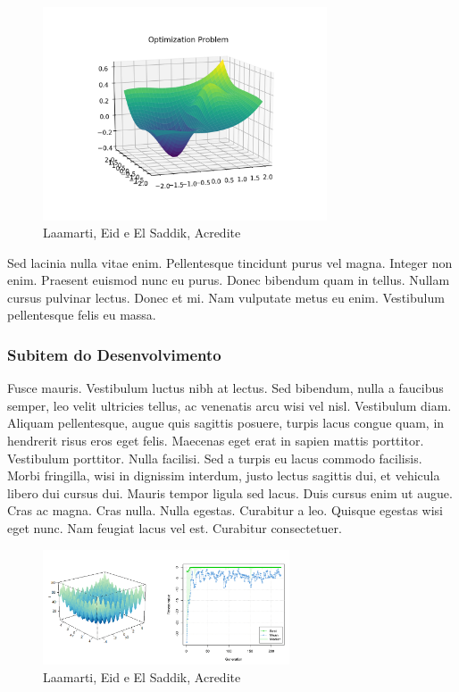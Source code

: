 \begin{figure}[h]
    \centering
    \includegraphics[width=0.75\textwidth]{images/plot2.png}
    \caption{Laamarti, Eid e El Saddik, Acredite}
\end{figure}

Sed lacinia nulla vitae enim. Pellentesque tincidunt purus vel magna.
Integer non enim. Praesent euismod nunc eu purus. Donec bibendum quam in tellus.
Nullam cursus pulvinar lectus. Donec et mi. Nam vulputate metus eu enim. Vestibulum
pellentesque felis eu massa. \\

\subsubsection{Subitem do Desenvolvimento}

Fusce mauris. Vestibulum luctus nibh at lectus. Sed bibendum, nulla a faucibus semper, leo
velit ultricies tellus, ac venenatis arcu wisi vel nisl. Vestibulum diam. Aliquam pellentesque,
augue quis sagittis posuere, turpis lacus congue quam, in hendrerit risus eros eget felis.
Maecenas eget erat in sapien mattis porttitor. Vestibulum porttitor. Nulla facilisi. Sed a
turpis eu lacus commodo facilisis. Morbi fringilla, wisi in dignissim interdum, justo lectus
sagittis dui, et vehicula libero dui cursus dui. Mauris tempor ligula sed lacus. Duis cursus
enim ut augue. Cras ac magna. Cras nulla. Nulla egestas. Curabitur a leo. Quisque egestas
wisi eget nunc. Nam feugiat lacus vel est. Curabitur consectetuer. \\

\begin{figure}[h]
    \centering
    \includegraphics[width=0.65\textwidth]{images/plot.png}
    \caption{Laamarti, Eid e El Saddik, Acredite}
\end{figure}

